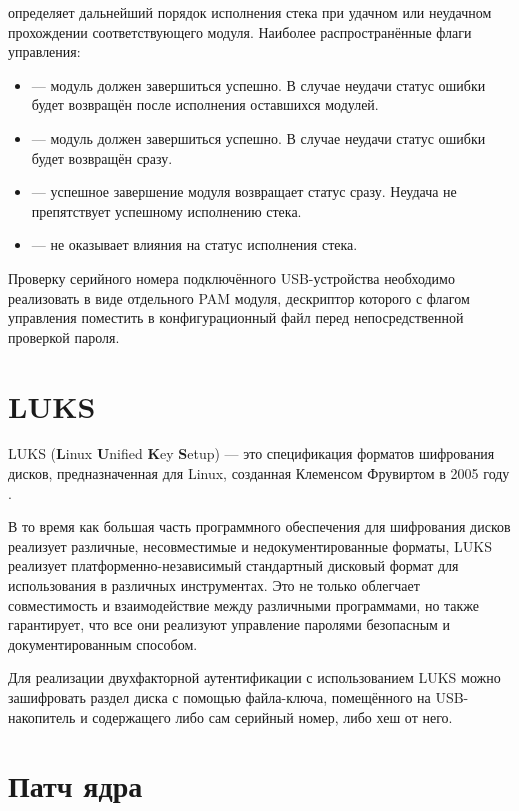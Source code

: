  определяет дальнейший порядок исполнения стека при удачном или неудачном прохождении соответствующего модуля.
Наиболее распространённые флаги управления:
\begin{itemize}
	\item {} — модуль должен завершиться успешно.
	В случае неудачи статус ошибки будет возвращён после исполнения оставшихся модулей.
	\item {} — модуль должен завершиться успешно.
	В случае неудачи статус ошибки будет возвращён сразу.
	\item {} — успешное завершение модуля возвращает статус  сразу.
	Неудача не препятствует успешному исполнению стека.
	\item {} — не оказывает влияния на статус исполнения стека.
\end{itemize}

Проверку серийного номера подключённого USB-устройства необходимо реализовать в виде отдельного PAM модуля, дескриптор которого с флагом управления  поместить в конфигурационный файл  перед непосредственной проверкой пароля.

\section{LUKS}

LUKS (\textbf{L}inux \textbf{U}nified \textbf{K}ey \textbf{S}etup) — это спецификация форматов шифрования дисков, предназначенная для Linux, созданная Клеменсом Фрувиртом в 2005 году \cite{fruhwirth}.

В то время как большая часть программного обеспечения для шифрования дисков реализует различные, несовместимые и недокументированные форматы, LUKS реализует платформенно-независимый стандартный дисковый формат для использования в различных инструментах.
Это не только облегчает совместимость и взаимодействие между различными программами, но также гарантирует, что все они реализуют управление паролями безопасным и документированным способом.

Для реализации двухфакторной аутентификации с использованием LUKS можно зашифровать раздел диска с помощью файла-ключа, помещённого на USB-накопитель и содержащего либо сам серийный номер, либо хеш от него.

\section{Патч ядра}

